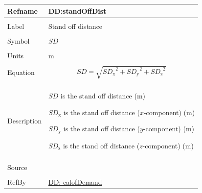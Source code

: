\documentclass[12pt]{article}
\begin{document}
\vspace{\baselineskip}
\noindent
\begin{minipage}{\textwidth}
\begin{tabular}{>{\raggedright}p{}>{\raggedright\arraybackslash}p{}}
\toprule \textbf{Refname} & \textbf{DD:standOffDist}
\label{DD:standOffDist}
\\ \midrule \\
Label & Stand off distance
        
\\ \midrule \\
Symbol & $SD$
         
\\ \midrule \\
Units & m
        
\\ \midrule \\
Equation & \begin{displaymath}
           SD=\sqrt{{SD_{\text{x}}}^{2}+{SD_{\text{y}}}^{2}+{SD_{\text{z}}}^{2}}
           \end{displaymath}
\\ \midrule \\
Description & \begin{symbDescription}
              \item{$SD$ is the stand off distance (m)}
              \item{${SD_{\text{x}}}$ is the stand off distance ($x$-component) (m)}
              \item{${SD_{\text{y}}}$ is the stand off distance ($y$-component) (m)}
              \item{${SD_{\text{z}}}$ is the stand off distance ($z$-component) (m)}
              \end{symbDescription}
\\ \midrule \\
Source & \cite{astm2009}
         
\\ \midrule \\
RefBy & \hyperref[DD:calofDemand]{DD: calofDemand}
        
\\ \bottomrule
\end{tabular}
\end{minipage}
\end{document}
